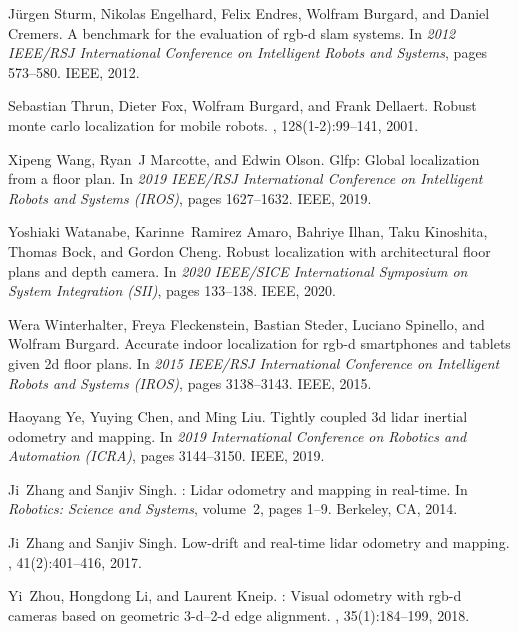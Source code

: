 \documentclass[letterpaper, 10 pt, conference]{ieeeconf}  %
\begin{document}
\begin{thebibliography}{10}
  J{\"u}rgen Sturm, Nikolas Engelhard, Felix Endres, Wolfram Burgard, and Daniel
    Cremers.
  \newblock A benchmark for the evaluation of rgb-d slam systems.
  \newblock In {\em 2012 IEEE/RSJ International Conference on Intelligent Robots
    and Systems}, pages 573--580. IEEE, 2012.
  
  Sebastian Thrun, Dieter Fox, Wolfram Burgard, and Frank Dellaert.
  \newblock Robust monte carlo localization for mobile robots.
  , 128(1-2):99--141, 2001.
  
  Xipeng Wang, Ryan~J Marcotte, and Edwin Olson.
  \newblock Glfp: Global localization from a floor plan.
  \newblock In {\em 2019 IEEE/RSJ International Conference on Intelligent Robots
    and Systems (IROS)}, pages 1627--1632. IEEE, 2019.
  
  Yoshiaki Watanabe, Karinne~Ramirez Amaro, Bahriye Ilhan, Taku Kinoshita, Thomas
    Bock, and Gordon Cheng.
  \newblock Robust localization with architectural floor plans and depth camera.
  \newblock In {\em 2020 IEEE/SICE International Symposium on System Integration
    (SII)}, pages 133--138. IEEE, 2020.
  
  Wera Winterhalter, Freya Fleckenstein, Bastian Steder, Luciano Spinello, and
    Wolfram Burgard.
  \newblock Accurate indoor localization for rgb-d smartphones and tablets given
    2d floor plans.
  \newblock In {\em 2015 IEEE/RSJ International Conference on Intelligent Robots
    and Systems (IROS)}, pages 3138--3143. IEEE, 2015.
  
  Haoyang Ye, Yuying Chen, and Ming Liu.
  \newblock Tightly coupled 3d lidar inertial odometry and mapping.
  \newblock In {\em 2019 International Conference on Robotics and Automation
    (ICRA)}, pages 3144--3150. IEEE, 2019.
  
  Ji~Zhang and Sanjiv Singh.
  : Lidar odometry and mapping in real-time.
  \newblock In {\em Robotics: Science and Systems}, volume~2, pages 1--9.
    Berkeley, CA, 2014.
  
  Ji~Zhang and Sanjiv Singh.
  \newblock Low-drift and real-time lidar odometry and mapping.
  , 41(2):401--416, 2017.
  
  Yi~Zhou, Hongdong Li, and Laurent Kneip.
  : Visual odometry with rgb-d cameras based on geometric
    3-d--2-d edge alignment.
  , 35(1):184--199, 2018.
  
\end{thebibliography}

\end{document}

